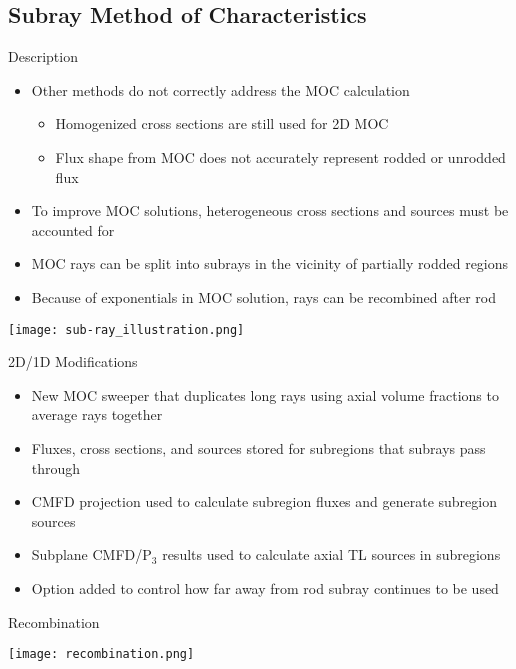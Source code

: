 \subsection{Subray Method of Characteristics}
\begin{frame}[t]{Description}

\begin{itemize}
    \item Other methods do not correctly address the MOC calculation
    \begin{itemize}
        \item Homogenized cross sections are still used for 2D MOC
        \item Flux shape from MOC does not accurately represent rodded or unrodded flux
    \end{itemize}
    \item To improve MOC solutions, heterogeneous cross sections and sources must be accounted for
    \item MOC rays can be split into subrays in the vicinity of partially rodded regions
    \item Because of exponentials in MOC solution, rays can be recombined after rod
\end{itemize}

\end{frame}


\begin{frame}
    
\begin{center}
\texttt{[image: sub-ray\_illustration.png]}
\end{center}

\end{frame}


\begin{frame}[t]{2D/1D Modifications}
    
    \begin{itemize}
        \item New MOC sweeper that duplicates long rays using axial volume fractions to average rays together
        \item Fluxes, cross sections, and sources stored for subregions that subrays pass through
        \item CMFD projection used to calculate subregion fluxes and generate subregion sources
        \item Subplane CMFD/P$_3$ results used to calculate axial TL sources in subregions
        \item Option added to control how far away from rod subray continues to be used
    \end{itemize}

\end{frame}


\begin{frame}[t]{Recombination}

\begin{center}
\texttt{[image: recombination.png]}
\end{center}

\end{frame}